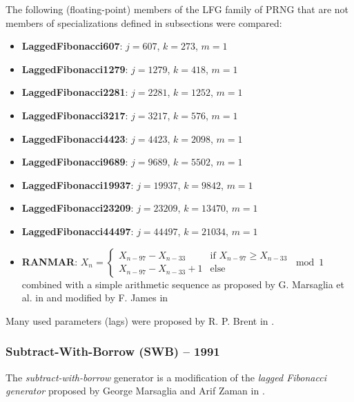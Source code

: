     The following (floating-point) members of the LFG family of PRNG that are not members of specializations defined in subsections were compared:
    \begin{itemize}
		\itemsep0em
        \item \textbf{LaggedFibonacci607}: $j = 607$, $k = 273$, $m = 1$
        \item \textbf{LaggedFibonacci1279}: $j = 1279$, $k = 418$, $m = 1$
        \item \textbf{LaggedFibonacci2281}: $j = 2281$, $k = 1252$, $m = 1$
        \item \textbf{LaggedFibonacci3217}: $j = 3217$, $k = 576$, $m = 1$
        \item \textbf{LaggedFibonacci4423}: $j = 4423$, $k = 2098$, $m = 1$
        \item \textbf{LaggedFibonacci9689}: $j = 9689$, $k = 5502$, $m = 1$
        \item \textbf{LaggedFibonacci19937}: $j = 19937$, $k = 9842$, $m = 1$
        \item \textbf{LaggedFibonacci23209}: $j = 23209$, $k = 13470$, $m = 1$
        \item \textbf{LaggedFibonacci44497}: $j = 44497$, $k = 21034$, $m = 1$
        \item \textbf{RANMAR}: $X_n = \begin{cases}
                                          X_{n - 97} - X_{n - 33}     & \text{if } X_{n - 97} \geq X_{n - 33} \\
                                          X_{n - 97} - X_{n - 33} + 1 & \text{else}
                                      \end{cases} \bmod 1$ \\
                               combined with a simple arithmetic sequence as proposed by G. Marsaglia et al. in \cite{Marsaglia:1990} and modified by F. James in \cite{James:1990}
    \end{itemize}

    Many used parameters (lags) were proposed by R. P. Brent in \cite{Brent:1992}.

\subsubsection[Subtract-With-Borrow (SWB) -- 1991]{Subtract-With-Borrow (SWB) -- 1991} \label{subsubsec:swb}

    The \emph{subtract-with-borrow} generator is a modification of the \emph{lagged Fibonacci generator} proposed by George Marsaglia and Arif Zaman in \cite{Marsaglia:1991}.

